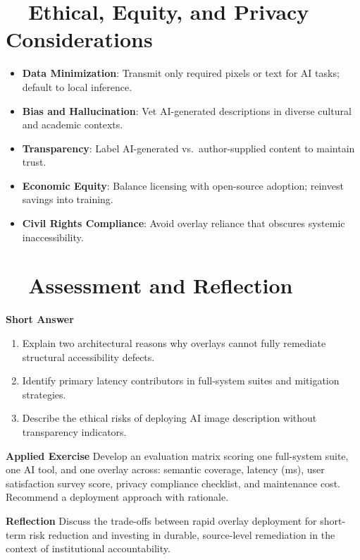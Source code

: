 \section{~~Ethical, Equity, and Privacy Considerations}
\label{sec:ch28-ethics}
\begin{itemize}
	\item \textbf{Data Minimization}: Transmit only required pixels or text for AI tasks; default to local inference\supercite{DataPrivacyAI}.
	\item \textbf{Bias and Hallucination}: Vet AI-generated descriptions in diverse cultural and academic contexts\supercite{Kim2023}.
	\item \textbf{Transparency}: Label AI-generated vs.\ author-supplied content to maintain trust.
	\item \textbf{Economic Equity}: Balance licensing with open-source adoption; reinvest savings into training\supercite{Burgstahler2015}.
	\item \textbf{Civil Rights Compliance}: Avoid overlay reliance that obscures systemic inaccessibility\supercite{Jaeger2006, Lazar2015}.
\end{itemize}

\section{~~Assessment and Reflection}
\label{sec:ch28-assessment}
\textbf{Short Answer}
\begin{enumerate}
	\item Explain two architectural reasons why overlays cannot fully remediate structural accessibility defects.
	\item Identify primary latency contributors in full-system suites and mitigation strategies.
	\item Describe the ethical risks of deploying AI image description without transparency indicators.
\end{enumerate}

\textbf{Applied Exercise} Develop an evaluation matrix scoring one full-system suite, one AI tool, and one overlay across: semantic coverage, latency (ms), user satisfaction survey score, privacy compliance checklist, and maintenance cost. Recommend a deployment approach with rationale.

\textbf{Reflection} Discuss the trade-offs between rapid overlay deployment for short-term risk reduction and investing in durable, source-level remediation in the context of institutional accountability.

